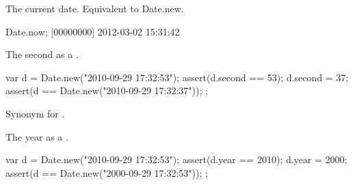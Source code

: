 \begin{urbiscriptapi}
\item[now] The current date. Equivalent to Date.new.
\begin{urbiunchecked}
Date.now;
[00000000] 2012-03-02 15:31:42
\end{urbiunchecked}

\item[second]
  The second as a .
\begin{urbiscript}
{
  var d = Date.new("2010-09-29 17:32:53");
  assert(d.second == 53);
  d.second = 37;
  assert(d == Date.new("2010-09-29 17:32:37"));
};
\end{urbiscript}

\item[timestamp] Synonym for .

\item[year]
  The year as a .
\begin{urbiscript}
{
  var d = Date.new("2010-09-29 17:32:53");
  assert(d.year == 2010);
  d.year = 2000;
  assert(d == Date.new("2000-09-29 17:32:53"));
};
\end{urbiscript}

\end{urbiscriptapi}


